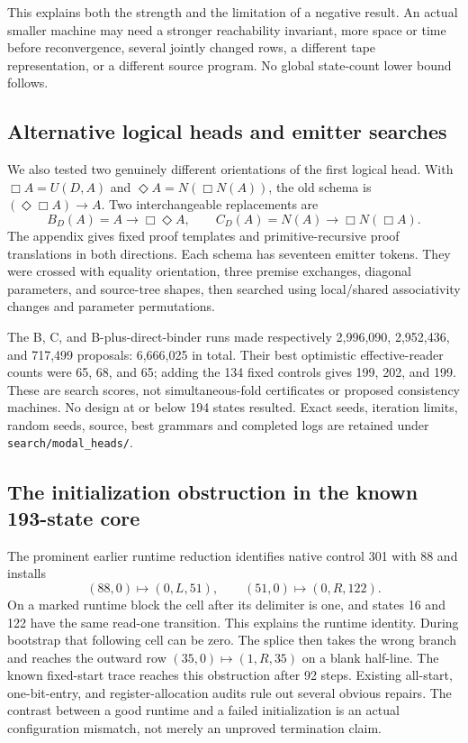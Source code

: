 \documentclass[11pt,letterpaper]{article}
\newcommand{\file}[1]{\texttt{\nolinkurl{#1}}}
\begin{document}
This explains both the strength and the limitation of a negative result.
An actual smaller machine may need a stronger reachability invariant,
more space or time before reconvergence, several jointly changed rows, a
different tape representation, or a different source program. No global
state-count lower bound follows.

\subsection{Alternative logical heads and emitter searches}

We also tested two genuinely different orientations of the first logical
head. With $\Box A=U(D,A)$ and $\Diamond A=N(\Box N(A))$, the old
schema is $(\Diamond\Box A)\to A$. Two interchangeable replacements are
\[
 B_D(A)=A\to\Box\Diamond A,\qquad
 C_D(A)=N(A)\to\Box N(\Box A).
\]
The appendix gives fixed proof templates and primitive-recursive proof
translations in both directions. Each schema has seventeen emitter
tokens. They were crossed with equality orientation, three premise
exchanges, diagonal parameters, and source-tree shapes, then searched
using local/shared associativity changes and parameter permutations.

The B, C, and B-plus-direct-binder runs made respectively
2,996,090, 2,952,436, and 717,499 proposals: 6,666,025 in total.
Their best optimistic effective-reader counts were 65, 68, and 65;
adding the 134 fixed controls gives 199, 202, and 199. These are search
scores, not simultaneous-fold certificates or proposed consistency
machines. No design at or below 194 states resulted. Exact seeds,
iteration limits, random seeds, source, best grammars and completed logs
are retained under \file{search/modal_heads/}.

\subsection{The initialization obstruction in the known 193-state core}

The prominent earlier runtime reduction identifies native control 301
with 88 and installs
\[
 (88,0)\mapsto(0,L,51),\qquad(51,0)\mapsto(0,R,122).
\]
On a marked runtime block the cell after its delimiter is one, and
states 16 and 122 have the same read-one transition. This explains the
runtime identity. During bootstrap that following cell can be zero.
The splice then takes the wrong branch and reaches the outward row
$(35,0)\mapsto(1,R,35)$ on a blank half-line. The known fixed-start
trace reaches this obstruction after 92 steps. Existing all-start,
one-bit-entry, and register-allocation audits rule out several obvious
repairs. The contrast between a good runtime and a failed initialization
is an actual configuration mismatch, not merely an unproved termination
claim.
\end{document}

